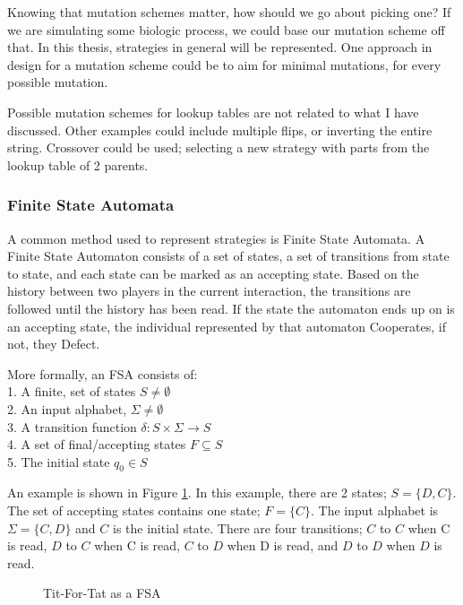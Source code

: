 \documentclass[a4paper,11pt,bcshonoursthesis,singlespace,twoside,thesisdraft,pdflatex]{cssethesis}
\begin{document}
Knowing that mutation schemes matter, how should we go about picking one?
If we are simulating some biologic process, we could base our mutation scheme off that. 
In this thesis, strategies in general will be represented. 
One approach in design for a mutation scheme could be to aim for minimal mutations, for every possible mutation. 

Possible mutation schemes for lookup tables are not related to what I have discussed. 
Other examples could include multiple flips, or inverting the entire string. 
Crossover could be used; selecting a new strategy with parts from the lookup table of 2 parents.

\subsubsection{Finite State Automata}
A common method used to represent strategies is Finite State Automata. 
A Finite State Automaton consists of a set of states, a set of transitions from state to state, and each state can be marked as an accepting state. 
Based on the history between two players in the current interaction, the transitions are followed until the history has been read. 
If the state the automaton ends up on is an accepting state, the individual represented by that automaton Cooperates, if not, they Defect. 

More formally, an FSA consists of:\\
1. A finite, set of states $S \neq  \emptyset$\\
2. An input alphabet, $\Sigma \neq  \emptyset$\\
3. A transition function $\delta : S \times \Sigma \rightarrow S$\\
4. A set of final/accepting states $F \subseteq S$ \\
5. The initial state $q_0 \in S$

An example is shown in Figure \ref{fig:fsa.tft.lang2}. 
In this example, there are 2 states; $S=\{D,C\}$. 
The set of accepting states contains one state; $F=\{C\}$. 
The input alphabet is $\Sigma=\{C,D\}$ and $C$ is the initial state. 
There are four transitions; $C$ to $C$ when C is read, $D$ to $C$ when C is read, $C$ to $D$ when D is read, and $D$ to $D$ when $D$ is read.

\begin{figure}[h]
\centering
\label{fig:fsa.tft.lang2}
\caption{Tit-For-Tat as a FSA}
\end{figure}
\end{document}
